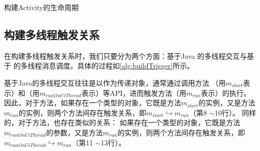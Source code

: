 \begin{algorithm}[!ht]
	\caption{构建Activity的生命周期} 
	\label{alg:buildActivityLifecycle}
	
	
\end{algorithm}


 \subsection{构建多线程触发关系}
在构建多线程触发关系时，我们只要分为两个方面：基于Java 的多线程交互与基于 的多线程消息调度。具体的过程如\autoref{alg:buildTrigger}所示。


基于Java的多线程交互往往是以作为传递对象，通常通过调用方法 （用$m_{start}$表示）和（用$m_{runOnUiThread}$表示）等API，进而触发方法（用$m_{run}$表示）的执行。
因此，对于方法，如果存在一个类型的对象，它既是方法$m_{start}$的实例，又是方法$m_{run}$的实例，则两个方法间存在触发关系，即$m_{start} \hookrightarrow m_{run}$（第8 $\sim$10行）。
同样的，对于方法，也存在类似的关系：
如果存在一个类型的对象，它既是方法$m_{runOnUiThread}$的参数，又是方法$m_{run}$的实例，则两个方法间存在触发关系，即$m_{runOnUiThread} \hookrightarrow m_{run}$（第11 $\sim$13行）。

